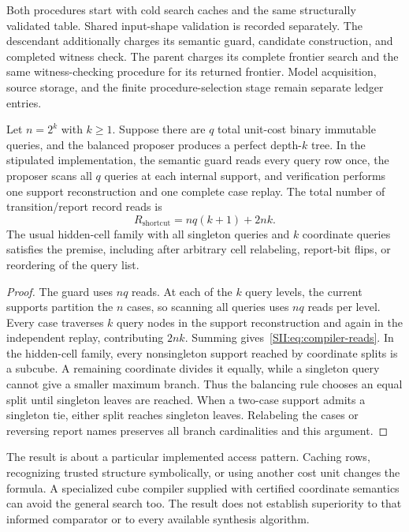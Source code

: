 Both procedures start with cold search caches and the same structurally validated table. Shared input-shape validation is recorded separately. The descendant additionally charges its semantic guard, candidate construction, and completed witness check. The parent charges its complete frontier search and the same witness-checking procedure for its returned frontier. Model acquisition, source storage, and the finite procedure-selection stage remain separate ledger entries.

\begin{SIIproposition}\label{SII:prop:compiler-work}
Let $n=2^k$ with $k\geq1$. Suppose there are $q$ total unit-cost binary immutable queries, and the balanced proposer produces a perfect depth-$k$ tree. In the stipulated implementation, the semantic guard reads every query row once, the proposer scans all $q$ queries at each internal support, and verification performs one support reconstruction and one complete case replay. The total number of transition/report record reads is
\begin{equation}\label{SII:eq:compiler-reads}
R_{\mathrm{shortcut}}=nq(k+1)+2nk.
\end{equation}
The usual hidden-cell family with all singleton queries and $k$ coordinate queries satisfies the premise, including after arbitrary cell relabeling, report-bit flips, or reordering of the query list.
\end{SIIproposition}
\begin{proof}
The guard uses $nq$ reads. At each of the $k$ query levels, the current supports partition the $n$ cases, so scanning all queries uses $nq$ reads per level. Every case traverses $k$ query nodes in the support reconstruction and again in the independent replay, contributing $2nk$. Summing gives~\eqref{SII:eq:compiler-reads}. In the hidden-cell family, every nonsingleton support reached by coordinate splits is a subcube. A remaining coordinate divides it equally, while a singleton query cannot give a smaller maximum branch. Thus the balancing rule chooses an equal split until singleton leaves are reached. When a two-case support admits a singleton tie, either split reaches singleton leaves. Relabeling the cases or reversing report names preserves all branch cardinalities and this argument.
\end{proof}

The result is about a particular implemented access pattern. Caching rows, recognizing trusted structure symbolically, or using another cost unit changes the formula. A specialized cube compiler supplied with certified coordinate semantics can avoid the general search too. The result does not establish superiority to that informed comparator or to every available synthesis algorithm.

